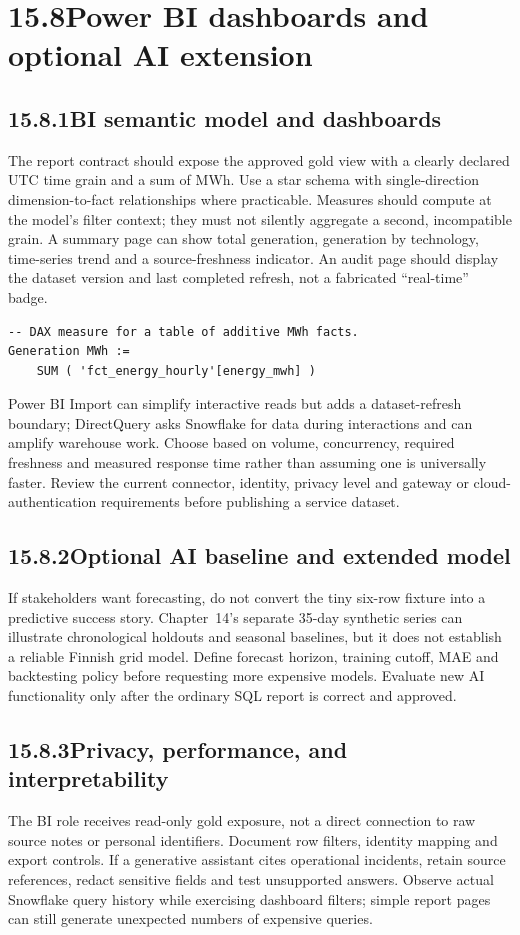 \documentclass[11pt,twoside]{article}
\newcommand{\topic}[2]{\subsection*{#1\quad #2}}
\begin{document}
\newpage

\section*{15.8\quad Power BI dashboards and optional AI extension}
\topic{15.8.1}{BI semantic model and dashboards}
The report contract should expose the approved gold view with a clearly declared UTC time grain and a sum of MWh. Use a star schema with single-direction dimension-to-fact relationships where practicable. Measures should compute at the model's filter context; they must not silently aggregate a second, incompatible grain. A summary page can show total generation, generation by technology, time-series trend and a source-freshness indicator. An audit page should display the dataset version and last completed refresh, not a fabricated ``real-time'' badge.
\begin{lstlisting}
-- DAX measure for a table of additive MWh facts.
Generation MWh :=
    SUM ( 'fct_energy_hourly'[energy_mwh] )
\end{lstlisting}
Power BI Import can simplify interactive reads but adds a dataset-refresh boundary; DirectQuery asks Snowflake for data during interactions and can amplify warehouse work. Choose based on volume, concurrency, required freshness and measured response time rather than assuming one is universally faster. Review the current connector, identity, privacy level and gateway or cloud-authentication requirements before publishing a service dataset.
\topic{15.8.2}{Optional AI baseline and extended model}
If stakeholders want forecasting, do not convert the tiny six-row fixture into a predictive success story. Chapter~14's separate 35-day synthetic series can illustrate chronological holdouts and seasonal baselines, but it does not establish a reliable Finnish grid model. Define forecast horizon, training cutoff, MAE and backtesting policy before requesting more expensive models. Evaluate new AI functionality only after the ordinary SQL report is correct and approved.
\topic{15.8.3}{Privacy, performance, and interpretability}
The BI role receives read-only gold exposure, not a direct connection to raw source notes or personal identifiers. Document row filters, identity mapping and export controls. If a generative assistant cites operational incidents, retain source references, redact sensitive fields and test unsupported answers. Observe actual Snowflake query history while exercising dashboard filters; simple report pages can still generate unexpected numbers of expensive queries.
\end{document}
